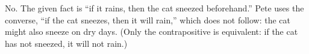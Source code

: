 No. The given fact is ``if it rains, then the cat sneezed beforehand.'' Pete uses the converse, ``if the cat sneezes, then it will rain,'' which does not follow: the cat might also sneeze on dry days. (Only the contrapositive is equivalent: if the cat has not sneezed, it will not rain.)
